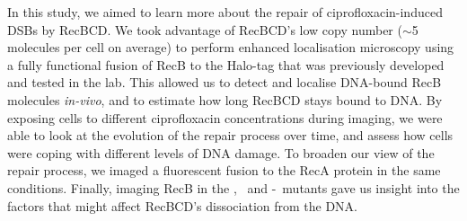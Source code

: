 In this study, we aimed to learn more about the repair of ciprofloxacin-induced DSBs by RecBCD. We took advantage of RecBCD's low copy number ($\sim$5 molecules per cell on average\cite{Lepore2019a}) to perform enhanced localisation microscopy\cite{Yu2006, Elf2007} using a fully functional fusion of RecB to the Halo-tag that was previously developed and tested in the lab\cite{Lepore2019a}. This allowed us to detect and localise DNA-bound RecB molecules \emph{in-vivo}, and to estimate how long RecBCD stays bound to DNA. By exposing cells to different ciprofloxacin concentrations during imaging, we were able to look at the evolution of the repair process over time, and assess how cells were coping with different levels of DNA damage. To broaden our view of the repair process, we imaged a fluorescent fusion to the RecA protein in the same conditions. Finally, imaging RecB in the \dreca, \teneighty\ and \dreca-\teneighty\ mutants gave us insight into the factors that might affect RecBCD's dissociation from the DNA.

